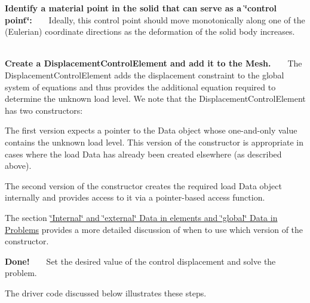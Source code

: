 \begin{DoxyEnumerate}
\item {\bfseries Identify a material point in the solid that can serve as a \char`\"{}control point\char`\"{}\+:} ~\newline
 ~\newline
 Ideally, this control point should move monotonically along one of the (Eulerian) coordinate directions as the deformation of the solid body increases. ~\newline
~\newline

\item {\bfseries Create a {\ttfamily Displacement\+Control\+Element} and add it to the {\ttfamily Mesh}.} ~\newline
~\newline
 The {\ttfamily Displacement\+Control\+Element} adds the displacement constraint to the global system of equations and thus provides the additional equation required to determine the unknown load level. We note that the {\ttfamily Displacement\+Control\+Element} has two constructors\+: ~\newline
~\newline

\begin{DoxyItemize}
\item The first version expects a pointer to the {\ttfamily Data} object whose one-\/and-\/only value contains the unknown load level. This version of the constructor is appropriate in cases where the load {\ttfamily Data} has already been created elsewhere (as described above). ~\newline
~\newline

\item The second version of the constructor creates the required load {\ttfamily Data} object internally and provides access to it via a pointer-\/based access function. ~\newline
~\newline

\end{DoxyItemize}The section \hyperlink{index_global_data}{\char`\"{}\+Internal\char`\"{} and \char`\"{}external\char`\"{} Data in elements and \char`\"{}global\char`\"{} Data in Problems} provides a more detailed discussion of when to use which version of the constructor. ~\newline
~\newline

\item {\bfseries Done!} ~\newline
~\newline
 Set the desired value of the control displacement and solve the problem. ~\newline
~\newline

\end{DoxyEnumerate}The driver code discussed below illustrates these steps.



